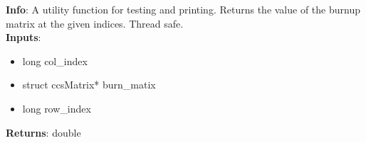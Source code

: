 \textbf{Info}: A utility function for testing and printing. Returns the value
of the burnup matrix at the given indices. Thread safe.\\

\noindent \textbf{Inputs}:
\begin{itemize}
\item{long col\_index}
\item{struct ccsMatrix* burn\_matix}
\item{long row\_index}
\end{itemize}

\noindent \textbf{Returns}: double
